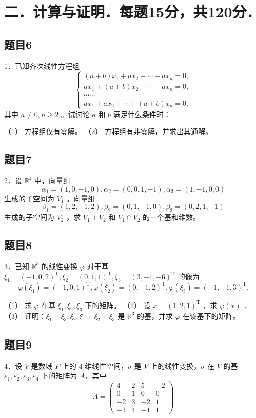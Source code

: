 \documentclass{article}
\begin{document}
\section*{二．计算与证明．每题15分，共120分．}

\subsection{题目6}
1．已知齐次线性方程组
\[
\left\{\begin{array}{c}
(a+b) x_{1}+a x_{2}+\cdots+a x_{n}=0, \\
a x_{1}+(a+b) x_{2}+\cdots+a x_{n}=0, \\
\cdots \cdots \\
a x_{1}+a x_{2}+\cdots+(a+b) x_{n}=0 .
\end{array}\right.
\]
其中 \(a \neq 0, n \geq 2\) 。试讨论 \(a\) 和 \(b\) 满足什么条件时：

（1） 方程组仅有零解。
（2） 方程组有非零解，并求出其通解。

\subsection{题目7}
2．设 \(\mathbb{R}^{4}\) 中，向量组
\[
\alpha_{1}=(1,0,-1,0), \alpha_{2}=(0,0,1,-1), \alpha_{3}=(1,-1,0,0)
\]
生成的子空间为 \(V_{1}\) 。向量组
\[
\beta_{1}=(1,2,-1,2), \beta_{2}=(0,1,-1,0), \beta_{3}=(0,2,1,-1)
\]
生成的子空间为 \(V_{2}\) ，求 \(V_{1}+V_{2}\) 和 \(V_{1} \cap V_{2}\) 的一个基和维数。

\subsection{题目8}
3．已知 \(\mathbb{R}^{3}\) 的线性变换 \(\varphi\) 对于基 \(\xi_{1}=(-1,0,2)^{\mathrm{T}}, \xi_{2}=(0,1,1)^{\mathrm{T}}, \xi_{3}=(3,-1,-6)^{\mathrm{T}}\) 的像为
\[
\varphi\left(\xi_{1}\right)=(-1,0,1)^{\mathrm{T}}, \varphi\left(\xi_{2}\right)=(0,-1,2)^{\mathrm{T}}, \varphi\left(\xi_{3}\right)=(-1,-1,3)^{\mathrm{T}} .
\]

（1） 求 \(\varphi\) 在基 \(\xi_{1}, \xi_{2}, \xi_{3}\) 下的矩阵。
（2） 设 \(x=(1,2,1)^{\mathrm{T}}\) ，求 \(\varphi(x)\) ．
（3） 证明：\(\xi_{1}-\xi_{3}, \xi_{2}, \xi_{1}+\xi_{2}+\xi_{3}\) 是 \(\mathbb{R}^{3}\) 的基，并求 \(\varphi\) 在该基下的矩阵。

\subsection{题目9}
4．设 \(V\) 是数域 \(P\) 上的 4 维线性空间，\(\sigma\) 是 \(V\) 上的线性变换，\(\sigma\) 在 \(V\) 的基 \(\varepsilon_{1}, \varepsilon_{2}, \varepsilon_{3}, \varepsilon_{4}\) 下的矩阵为 \(A\)，其中
\[
A=\left(\begin{array}{cccc}
4 & 2 & 5 & -2 \\
0 & 1 & 0 & 0 \\
-2 & 3 & -2 & 1 \\
-1 & 4 & -1 & 1
\end{array}\right)
\]
\end{document}
